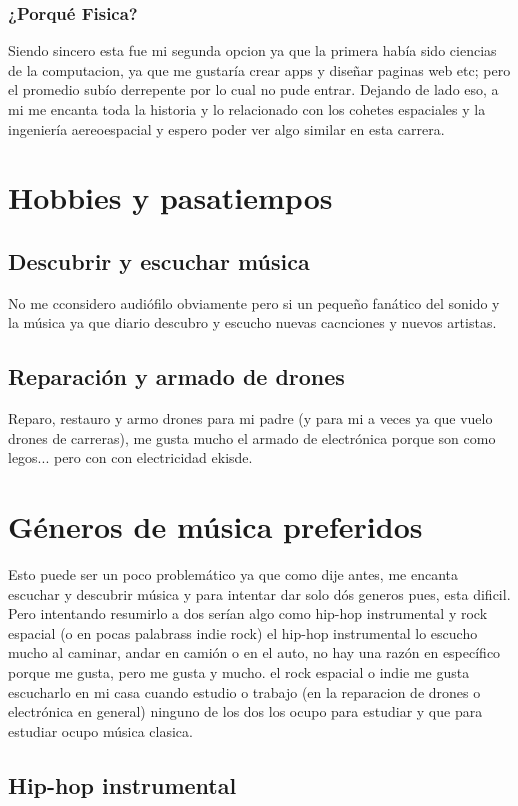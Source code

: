\documentclass[12pt,a4paper]{article}
\begin{document}
\subsubsection*{¿Porqué Fisica?}
Siendo sincero esta fue mi segunda opcion ya que la primera había sido ciencias de la computacion, ya que me gustaría crear apps y diseñar paginas web etc; pero el promedio subío derrepente por lo cual no pude entrar. Dejando de lado eso, a mi me encanta toda la historia y lo relacionado con los cohetes espaciales y la ingeniería aereoespacial y espero poder ver algo similar en esta carrera. 
\section*{Hobbies y pasatiempos}
\subsection*{Descubrir y escuchar música}
No me cconsidero audiófilo obviamente pero si un pequeño fanático del sonido y la música ya que diario descubro y escucho nuevas cacnciones y nuevos artistas. %
\subsection*{Reparación y armado de drones} %
Reparo, restauro y armo drones para mi padre (y para mi a veces ya que vuelo drones de carreras), me gusta mucho el armado de electrónica porque son como legos... pero con con electricidad ekisde.
\section*{Géneros de música preferidos}
Esto puede ser un poco problemático ya que como dije antes, me encanta escuchar y descubrir música y para intentar dar solo dós generos pues, esta dificil. \\ Pero intentando resumirlo a dos serían algo como hip-hop instrumental y rock espacial (o en pocas palabrass indie rock) 
el hip-hop instrumental lo escucho mucho al caminar, andar en camión o en el auto, no hay una razón en específico porque me gusta, pero me gusta y mucho. 
el rock espacial o indie me gusta escucharlo en mi casa cuando estudio o trabajo (en la reparacion de drones o electrónica en general) 
ninguno de los dos los ocupo para estudiar y que para estudiar ocupo música clasica.
\subsection*{Hip-hop instrumental}
\end{document}
